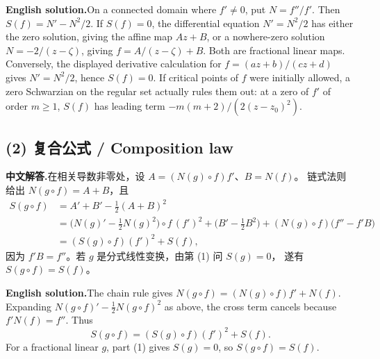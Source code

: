 \documentclass[11pt,a4paper]{ctexart}
\newcommand{\CN}{\textbf{中文解答.}\enspace}
\newcommand{\EN}{\textbf{English solution.}\enspace}
\begin{document}
\EN On a connected domain where $f'\ne0$, put $N=f''/f'$.
Then $S(f)=N'-N^2/2$. If $S(f)=0$, the differential equation
$N'=N^2/2$ has either the zero solution, giving the affine map $Az+B$,
or a nowhere-zero solution $N=-2/(z-\zeta)$, giving
$f=A/(z-\zeta)+B$. Both are fractional linear maps.
Conversely, the displayed derivative calculation for
$f=(az+b)/(cz+d)$ gives $N'=N^2/2$, hence $S(f)=0$.
If critical points of $f$ were initially allowed, a zero Schwarzian on the
regular set actually rules them out: at a zero of $f'$ of order $m\ge1$,
$S(f)$ has leading term $-m(m+2)/(2(z-z_0)^2)$.

\subsection*{(2) 复合公式 / Composition law}
\CN 在相关导数非零处，设 $A=(N(g)\circ f)f'$、$B=N(f)$。
链式法则给出 $N(g\circ f)=A+B$，且
\[
 \begin{aligned}
 S(g\circ f)
 &=A'+B'-\tfrac12(A+B)^2\\
 &=\bigl(N(g)'-\tfrac12N(g)^2\bigr)\circ f\,(f')^2
   +\bigl(B'-\tfrac12B^2\bigr)
   +(N(g)\circ f)\bigl(f''-f'B\bigr)\\
 &=(S(g)\circ f)(f')^2+S(f),
 \end{aligned}
\]
因为 $f'B=f''$。若 $g$ 是分式线性变换，由第 (1) 问 $S(g)=0$，
遂有 $S(g\circ f)=S(f)$。

\EN The chain rule gives $N(g\circ f)=(N(g)\circ f)f'+N(f)$.
Expanding $N(g\circ f)'-\tfrac12N(g\circ f)^2$ as above,
the cross term cancels because $f'N(f)=f''$. Thus
\[
 \boxed{\displaystyle S(g\circ f)=(S(g)\circ f)(f')^2+S(f).}
\]
For a fractional linear $g$, part (1) gives $S(g)=0$, so
$S(g\circ f)=S(f)$.
\end{document}
